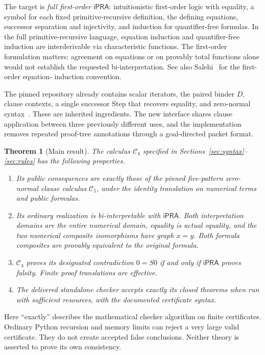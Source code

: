\documentclass[11pt]{article}
\newtheorem{theorem}{Theorem}[section]
\theoremstyle{definition}
\newcommand{\RC}{\mathcal C_4}
\newcommand{\Old}{\mathcal C_5}
\newcommand{\ipra}{\mathsf{iPRA}}
\begin{document}
The target is \emph{full first-order} $\ipra$: intuitionistic first-order
logic with equality, a symbol for each fixed primitive-recursive definition,
the defining equations, successor separation and injectivity, and induction
for quantifier-free formulas. In the full primitive-recursive language,
equation induction and quantifier-free induction are interderivable via
characteristic functions. The first-order formulation matters: agreement on
equations or on provably total functions alone would not establish the requested
bi-interpretation. See also Salehi~\cite{salehi} for the first-order equation-
induction convention.

The pinned repository already contains scalar iterators, the paired binder
$D$, clause contexts, a single successor Step that recovers equality, and
zero-normal syntax~\cite{baseline,uniformstep,nativezerostep}. These are
inherited ingredients. The new interface shares clause application between
three previously different uses, and the implementation removes repeated
proof-tree annotations through a goal-directed packet format.

\begin{theorem}[Main result]
\label{thm:main}
The calculus $\RC$ specified in Sections~\ref{sec:syntax}--\ref{sec:rules}
has the following properties.
\begin{enumerate}
\item Its public consequences are exactly those of the pinned five-pattern
zero-normal clause calculus $\Old$, under the identity translation on
numerical terms and public formulas.
\item Its ordinary realization is bi-interpretable with $\ipra$. Both
interpretation domains are the entire numerical domain, equality is actual
equality, and the two numerical composite isomorphisms have graph $x=y$.
Both formula composites are provably equivalent to the original formula.
\item $\RC$ proves its designated contradiction $0=S0$ if and only if
$\ipra$ proves falsity. Finite proof translations are effective.
\item The delivered standalone checker accepts exactly its closed theorems
when run with sufficient resources, with the documented certificate syntax.
\end{enumerate}
\end{theorem}

Here ``exactly'' describes the mathematical checker algorithm on finite
certificates. Ordinary Python recursion and memory limits can reject a very
large valid certificate. They do not create accepted false conclusions.
Neither theory is asserted to prove its own consistency.
\end{document}
